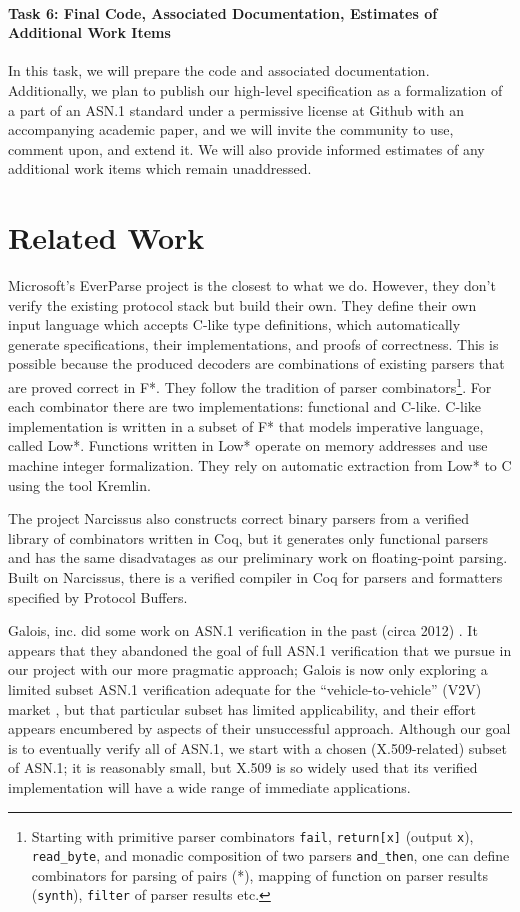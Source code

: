 \documentclass[10p,conference]{IEEEtran}
\begin{document}
\paragraph{Task 6: Final Code, Associated Documentation, Estimates of Additional Work Items}
In this task, we will prepare the code and associated documentation. Additionally, we plan to publish our high-level specification as a formalization of a part of an ASN.1 standard under a permissive license at Github with an accompanying academic paper, and we will invite the community to use, comment upon, and extend it. 
We will also provide informed estimates of any additional work items which remain unaddressed. 

\section{Related Work}

Microsoft's EverParse project \cite{RamananandroDFS19} is the closest
to what we do. However, they don't verify the existing protocol stack but
build their own. They define their own input language which accepts
C-like type definitions, which automatically generate specifications, their implementations, and proofs of correctness. This is possible because the produced decoders are combinations of existing parsers that are proved correct in F*. They
follow the tradition of parser combinators\footnote{Starting with
  primitive parser combinators \texttt{fail}, \texttt{return[x]}
  (output \texttt{x}), \texttt{read\_byte}, and monadic composition of
  two parsers \texttt{and\_then}, one can define combinators for
  parsing of pairs (*), mapping of function on parser results
  (\texttt{synth}), \texttt{filter} of parser results etc.}. For each
combinator there are two implementations: functional and
C-like. C-like implementation is written in a subset of F* that models
imperative language, called Low*. Functions written in Low* operate on
memory addresses and use machine integer formalization. They rely on
automatic extraction from Low* to C using the tool Kremlin.

The project Narcissus \cite{Narcissus} also constructs correct binary parsers from a verified
library of combinators written in Coq, but it generates only functional
parsers and has the same disadvatages as our preliminary work on floating-point parsing. Built on Narcissus, there is a verified compiler in Coq for
parsers and formatters specified by Protocol Buffers.
 
Galois, inc. did some work on ASN.1 verification in
the past (circa 2012) \cite{ASN1FormalSem}. It appears that they abandoned
 the goal of full ASN.1 verification \cite{ASN1EncDec} that we pursue in
our project with our more pragmatic approach; Galois is now only
exploring a limited subset ASN.1 verification adequate for the
``vehicle-to-vehicle'' (V2V) market \cite{V2V}, but that
particular subset has limited applicability, and their
effort appears encumbered by aspects of their unsuccessful approach. Although our goal is to eventually verify all of ASN.1, we
start with a chosen (X.509-related) subset of ASN.1; it is reasonably small, but X.509 is so widely used that its verified implementation will have a wide range of immediate applications.
\end{document}
